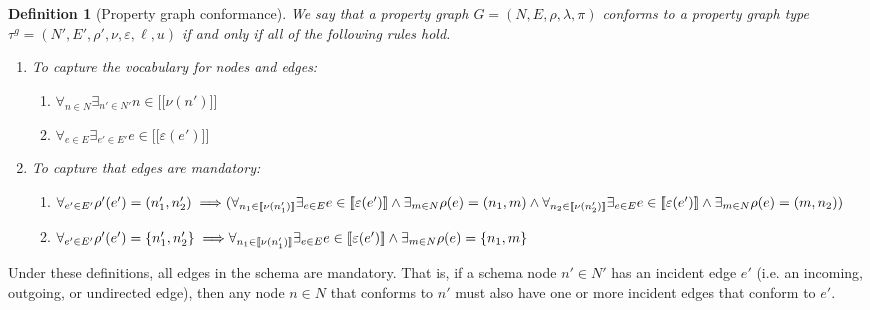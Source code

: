 \documentclass[a4paper]{article}
\newtheorem{definition}[theorem]{Definition}
\newcommand{\gtype}{\tau^g}
\newcommand{\lsem}{\ensuremath{[\![}}
\newcommand{\rsem}{\ensuremath{]\!]}}
\newcommand{\sem}[1]{\ensuremath{\lsem #1 \rsem}}
\DeclareMathOperator{\inc}{inc}
\begin{document}

\begin{definition}[Property graph conformance]
  We say that a property graph $G = (N, E, \rho, \lambda, \pi)$ \emph{conforms} to a property graph type $\gtype = (N', E', \rho', \nu, \varepsilon, \ell, u)$ if and only if all of the following rules hold.

  \begin{enumerate}
    \item To capture the vocabulary for nodes and edges:
    \begin{enumerate}
      \item $\forall_{n \in N} \exists_{n' \in N'} n \in \sem{\nu(n')}$
      \item $\forall_{e \in E} \exists_{e' \in E'} e \in \sem{\varepsilon(e')}$
    \end{enumerate}
    \item To capture that edges are mandatory:
    \begin{enumerate}
      \item $\forall_{e' \in E'} \rho'(e') = (n'_1, n'_2) \implies
      \\\\(\forall_{n_1 \in \sem{\nu(n'_1)}} \exists_{e \in E} e \in \sem{\varepsilon(e')} \wedge \exists_{m \in N} \rho(e) = (n_1, m) \wedge
      \\\\ \forall_{n_2 \in \sem{\nu(n'_2)}} \exists_{e \in E} e \in \sem{\varepsilon(e')} \wedge \exists_{m \in N} \rho(e) = (m, n_2))$

      \item $\forall_{e' \in E'} \rho'(e') = \{n'_1, n'_2\} \implies
      \\\\\forall_{n_1 \in \sem{\nu(n'_1)}} \exists_{e \in E} e \in \sem{\varepsilon(e')} \wedge \exists_{m \in N} \rho(e) = \{n_1, m\}$
    \end{enumerate}
  \end{enumerate}
\end{definition}

Under these definitions, all edges in the schema are mandatory. That is, if a schema node $n' \in N'$ has an incident edge $e'$ (i.e. an incoming, outgoing, or undirected edge), then any node $n \in N$ that conforms to $n'$ must also have one or more incident edges that conform to $e'$.
\end{document}
